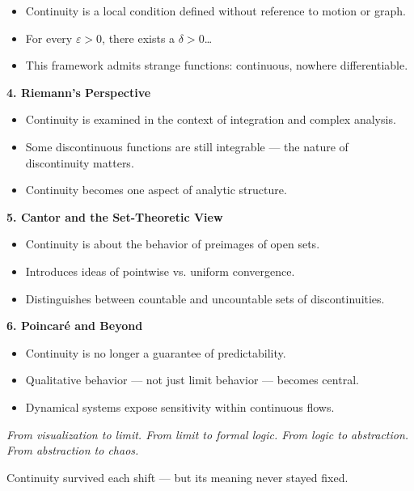 \documentclass[9pt]{article}
\begin{document}
\begin{itemize}
  \item Continuity is a local condition defined without reference to motion or graph.
  \item For every $\varepsilon > 0$, there exists a $\delta > 0$…
  \item This framework admits strange functions: continuous, nowhere differentiable.
\end{itemize}

\bigskip

\textbf{4. Riemann’s Perspective}

\begin{itemize}
  \item Continuity is examined in the context of integration and complex analysis.
  \item Some discontinuous functions are still integrable — the nature of discontinuity matters.
  \item Continuity becomes one aspect of analytic structure.
\end{itemize}

\bigskip

\textbf{5. Cantor and the Set-Theoretic View}

\begin{itemize}
  \item Continuity is about the behavior of preimages of open sets.
  \item Introduces ideas of pointwise vs. uniform convergence.
  \item Distinguishes between countable and uncountable sets of discontinuities.
\end{itemize}

\bigskip

\textbf{6. Poincaré and Beyond}

\begin{itemize}
  \item Continuity is no longer a guarantee of predictability.
  \item Qualitative behavior — not just limit behavior — becomes central.
  \item Dynamical systems expose sensitivity within continuous flows.
\end{itemize}

\bigskip

\textit{From visualization to limit.  
From limit to formal logic.  
From logic to abstraction.  
From abstraction to chaos.}

Continuity survived each shift — but its meaning never stayed fixed.
\end{document}
